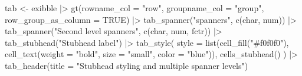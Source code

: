 \documentclass[
  letterpaper,
  DIV=11,
  numbers=noendperiod]{scrartcl}
\newenvironment{Shaded}{\begin{snugshade}}{\end{snugshade}}
\newcommand{\AttributeTok}[1]{\textcolor[rgb]{0.40,0.45,0.13}{#1}}
\newcommand{\ConstantTok}[1]{\textcolor[rgb]{0.56,0.35,0.01}{#1}}
\newcommand{\FunctionTok}[1]{\textcolor[rgb]{0.28,0.35,0.67}{#1}}
\newcommand{\NormalTok}[1]{\textcolor[rgb]{0.00,0.23,0.31}{#1}}
\newcommand{\OtherTok}[1]{\textcolor[rgb]{0.00,0.23,0.31}{#1}}
\newcommand{\SpecialCharTok}[1]{\textcolor[rgb]{0.37,0.37,0.37}{#1}}
\newcommand{\StringTok}[1]{\textcolor[rgb]{0.13,0.47,0.30}{#1}}
\begin{document}
\begin{Shaded}
\begin{Highlighting}[]
\NormalTok{tab }\OtherTok{\textless{}{-}}\NormalTok{ exibble }\SpecialCharTok{|\textgreater{}}
  \FunctionTok{gt}\NormalTok{(}\AttributeTok{rowname\_col =} \StringTok{"row"}\NormalTok{, }\AttributeTok{groupname\_col =} \StringTok{"group"}\NormalTok{, }\AttributeTok{row\_group\_as\_column =} \ConstantTok{TRUE}\NormalTok{) }\SpecialCharTok{|\textgreater{}}
  \FunctionTok{tab\_spanner}\NormalTok{(}\StringTok{"spanners"}\NormalTok{, }\FunctionTok{c}\NormalTok{(char, num)) }\SpecialCharTok{|\textgreater{}}
  \FunctionTok{tab\_spanner}\NormalTok{(}\StringTok{"Second level spanners"}\NormalTok{, }\FunctionTok{c}\NormalTok{(char, num, fctr)) }\SpecialCharTok{|\textgreater{}}
  \FunctionTok{tab\_stubhead}\NormalTok{(}\StringTok{"Stubhead label"}\NormalTok{) }\SpecialCharTok{|\textgreater{}}
  \FunctionTok{tab\_style}\NormalTok{(}
    \AttributeTok{style =} \FunctionTok{list}\NormalTok{(}\FunctionTok{cell\_fill}\NormalTok{(}\StringTok{"\#f0f0f0"}\NormalTok{), }\FunctionTok{cell\_text}\NormalTok{(}\AttributeTok{weight =} \StringTok{"bold"}\NormalTok{, }\AttributeTok{size =} \StringTok{"small"}\NormalTok{, }\AttributeTok{color =} \StringTok{"blue"}\NormalTok{)),}
    \FunctionTok{cells\_stubhead}\NormalTok{()}
\NormalTok{  ) }\SpecialCharTok{|\textgreater{}} 
  \FunctionTok{tab\_header}\NormalTok{(}\AttributeTok{title =} \StringTok{"Stubhead styling and multiple spanner levels"}\NormalTok{)}
\end{Highlighting}
\end{Shaded}
\end{document}
